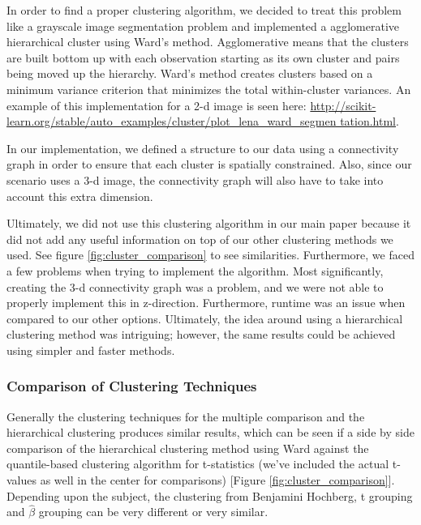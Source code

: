\par In order to find a proper clustering algorithm, we decided to treat this
problem like a grayscale image segmentation problem and implemented a
agglomerative hierarchical cluster using Ward's method. Agglomerative means
that the clusters are built bottom up with each observation starting as its
own cluster and pairs being moved up the hierarchy. Ward's method creates
clusters based on a minimum variance criterion that minimizes the total
within-cluster variances. An example of this implementation for a 2-d image is
seen here: 
\url{http://scikit-learn.org/stable/auto_examples/cluster/plot_lena_ward_segmen
tation.html}.

In our implementation, we defined a structure to our data using a connectivity
graph in order to ensure that each cluster is spatially constrained. Also,
since our scenario uses a 3-d image, the connectivity graph will also have to
take into account this extra dimension.

\par Ultimately, we did not use this clustering algorithm in our main paper
because it did not add any useful information on top of our other clustering
methods we used. See figure \ref{fig:cluster_comparison} to see similarities. 
Furthermore, we faced a few
problems when trying to implement the algorithm. Most significantly, creating
the 3-d connectivity graph was a problem, and we were not able to properly
implement this in z-direction. Furthermore, runtime was an issue when compared
to our other options. Ultimately, the idea around using a hierarchical
clustering method was intriguing; however, the same results could be achieved
using simpler and faster methods.


\subsubsection{Comparison of Clustering Techniques}
Generally the clustering techniques for the multiple comparison and the 
hierarchical clustering produces similar results, which can be seen if a 
side by side comparison of the hierarchical clustering method using Ward
against the quantile-based clustering algorithm for t-statistics (we've
included the actual t-values as well in the center for comparisons) 
[Figure \ref{fig:cluster_comparison}]. Depending upon the subject, the clustering 
from Benjamini Hochberg, t grouping and $\hat{\beta}$ grouping can be 
very different or very similar.



